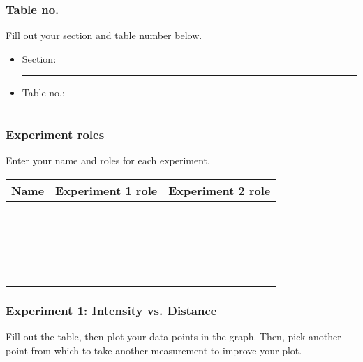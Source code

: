 \documentclass[main.tex]{subfiles}
\begin{document}
\subsubsection{Table no.}
Fill out your section and table number below.
\begin{itemize}
\item Section: \rule{2cm}{.15mm}
\item Table no.: \rule{2cm}{.15mm}
\end{itemize}

\subsubsection{Experiment roles}
Enter your name and roles for each experiment.
\begin{table}[h!]
\begin{center}
\begin{tabular}{|p{5cm}|p{5cm}|p{5cm}|}\hline
Name & Experiment 1 role & Experiment 2 role \\\hline
&&\\
&&\\\hline
&&\\
&&\\\hline
&&\\
&&\\\hline
&&\\
&&\\\hline
&&\\
&&\\\hline
&&\\
&&\\\hline
&&\\
&&\\\hline
&&\\
&&\\\hline
&&\\
&&\\\hline
&&\\
&&\\\hline
\end{tabular}
\end{center}
\label{tab:roles}
\end{table}

\newpage
\subsubsection{Experiment 1: Intensity vs. Distance}
Fill out the table, then plot your data points in the graph. Then, pick another point from which to take another measurement to improve your plot.
\end{document}

